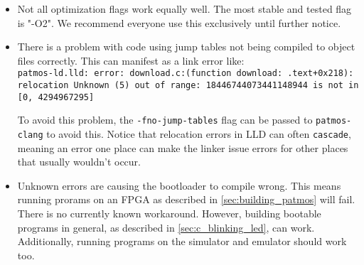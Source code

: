 \begin{itemize}
	\item Not all optimization flags work equally well.
		The most stable and tested flag is "-O2". We recommend everyone use this exclusively until further notice.
		
	\item There is a problem with code using jump tables not being compiled to object files correctly.
		This can manifest as a link error like: \\
		\texttt{patmos-ld.lld: error: download.c:(function download: .text+0x218): relocation Unknown (5) out of range: 18446744073441148944 is not in [0, 4294967295]}
		
		To avoid this problem, the \texttt{-fno-jump-tables} flag can be passed to \texttt{patmos-clang} to avoid this.
		Notice that relocation errors in LLD can often \texttt{cascade}, meaning an error one place can make the linker issue errors for other places that usually wouldn't occur.
		
	\item Unknown errors are causing the bootloader to compile wrong.
		This means running prorams on an FPGA as described in \autoref{sec:building_patmos} will fail.
		There is no currently known workaround.
		However, building bootable programs in general, as described in \autoref{sec:c_blinking_led}, can work.
		Additionally, running programs on the simulator and emulator should work too.
\end{itemize}


